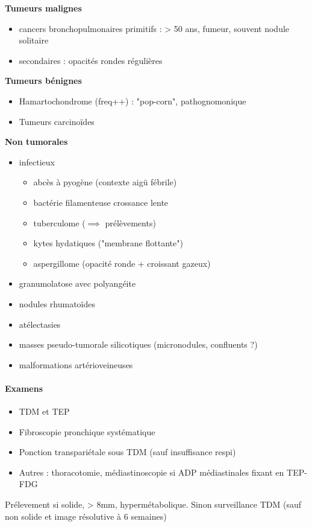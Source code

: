 \documentclass{article}
\begin{document}
\textbf{Tumeurs malignes}  
\begin{itemize}
\item cancers bronchopulmonaires primitifs : > 50 ans, fumeur, souvent nodule
  solitaire
\item secondaires : opacités rondes régulières
\end{itemize}

\textbf{Tumeurs bénignes} 
\begin{itemize}
\item Hamartochondrome (freq++) : "pop-corn", pathognomonique
\item Tumeurs  carcinoïdes
\end{itemize}

\textbf{Non tumorales}
\begin{itemize}
\item infectieux 
  \begin{itemize}
  \item abcès à pyogène (contexte aigü fébrile)
  \item bactérie filamenteuse crossance lente
  \item tuberculome ($\implies$ prélèvements)
  \item kytes hydatiques ("membrane flottante")
  \item aspergillome (opacité ronde + croissant gazeux)
  \end{itemize}
\item granumolatose avec polyangéite
\item nodules rhumatoïdes
\item atélectasies
\item masses pseudo-tumorale silicotiques (micronodules, confluents ?)
\item malformations artérioveineuses
\end{itemize}

\paragraph{Examens}
\begin{itemize}
\item TDM et TEP
\item Fibroscopie pronchique systématique
\item Ponction transpariétale sous TDM (sauf insuffisance respi)
\item Autres : thoracotomie, médiastinoscopie si ADP médiastinales fixant en TEP-FDG
\end{itemize}
Prélevement si solide, > 8mm, hypermétabolique. Sinon surveillance TDM (sauf non solide et image résolutive à 6 semaines)
\end{document}
